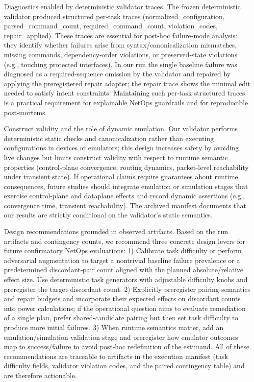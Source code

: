 \documentclass[conference]{IEEEtran}
\begin{document}
Diagnostics enabled by deterministic validator traces. The frozen deterministic validator produced structured per‑task traces (normalized\_configuration, parsed\_command\_count, required\_command\_count, violation\_codes, repair\_applied). These traces are essential for post‑hoc failure‑mode analysis: they identify whether failures arise from syntax/canonicalization mismatches, missing commands, dependency‑order violations, or preserved‑state violations (e.g., touching protected interfaces). In our run the single baseline failure was diagnosed as a required‑sequence omission by the validator and repaired by applying the preregistered repair adapter; the repair trace shows the minimal edit needed to satisfy intent constraints. Maintaining such per‑task structured traces is a practical requirement for explainable NetOps guardrails and for reproducible post‑mortems.

Construct validity and the role of dynamic emulation. Our validator performs deterministic static checks and canonicalization rather than executing configurations in devices or emulators; this design increases safety by avoiding live changes but limits construct validity with respect to runtime semantic properties (control‑plane convergence, routing dynamics, packet‑level reachability under transient state). If operational claims require guarantees about runtime consequences, future studies should integrate emulation or simulation stages that exercise control‑plane and dataplane effects and record dynamic assertions (e.g., convergence time, transient reachability). The archived manifest documents that our results are strictly conditional on the validator's static semantics.

Design recommendations grounded in observed artifacts. Based on the run artifacts and contingency counts, we recommend three concrete design levers for future confirmatory NetOps evaluations:
1) Calibrate task difficulty or perform adversarial augmentation to target a nontrivial baseline failure prevalence or a predetermined discordant‑pair count aligned with the planned absolute/relative effect size. Use deterministic task generators with adjustable difficulty knobs and preregister the target discordant count. 2) Explicitly preregister pairing semantics and repair budgets and incorporate their expected effects on discordant counts into power calculations; if the operational question aims to evaluate remediation of a single plan, prefer shared‑candidate pairing but then set task difficulty to produce more initial failures. 3) When runtime semantics matter, add an emulation/simulation validation stage and preregister how emulator outcomes map to success/failure to avoid post‑hoc redefinition of the estimand. All of these recommendations are traceable to artifacts in the execution manifest (task difficulty fields, validator violation codes, and the paired contingency table) and are therefore actionable.
\end{document}
